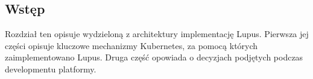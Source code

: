 \subsection{Wstęp}
Rozdział ten opisuje wydzieloną z architektury implementację Lupus. Pierwsza jej części opisuje kluczowe mechanizmy Kubernetes, za pomocą których zaimplementowano Lupus. Druga część opowiada o decyzjach podjętych podczas developmentu platformy.
